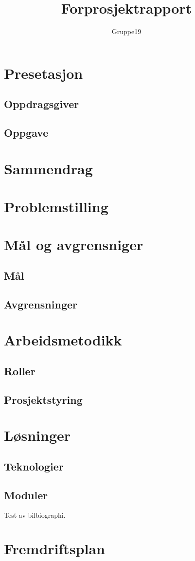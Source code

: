 \documentclass[11pt,a4paper,titlepage]{report}
\author{Gruppe19}
\title{Forprosjektrapport}
\begin{document}
\maketitle
\tableofcontents

\chapter{Presetasjon}
\section{Oppdragsgiver}
\section{Oppgave}


\chapter{Sammendrag}


\chapter{Problemstilling}


\chapter{Mål og avgrensniger}
\section{Mål}
\section{Avgrensninger}


\chapter{Arbeidsmetodikk}
\section{Roller}
\section{Prosjektstyring}



\chapter{Løsninger}
\section{Teknologier}
\section{Moduler}
Test av bilbiographi\cite{book:unixprog}.





\appendix
\chapter{Fremdriftsplan}
\end{document}
